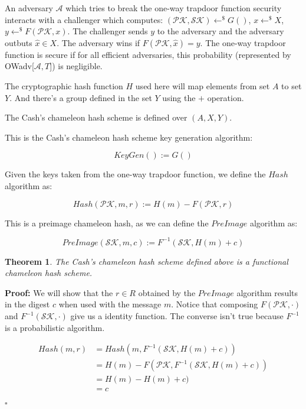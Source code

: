 \documentclass[a4paper]{article}
\newtheorem{theorem}{Theorem}
\newcommand*{\qed}{\hfill\ensuremath{\square}}
\begin{document}
 An adversary $\mathcal{A}$ which tries to break the one-way trapdoor
 function security interacts with a challenger which computes:
 $(\mathcal{PK}, \mathcal{SK}) \leftarrow^{\$}G()$, $x
 \leftarrow^{\$}X$, $y \leftarrow^{\$}F(\mathcal{PK}, x)$. The
 challenger sends $y$ to the adversary and the adversary outbuts $\hat
 x \in X$. The adversary wins if $F(\mathcal{PK}, \hat x) = y$. The
 one-way trapdoor function is secure if for all efficient adversaries,
 this probability (represented by OWadv[$\mathcal{A}, T$]) is
 negligible.
 
 The cryptographic hash function $H$ used here will map elements from
 set $A$ to set $Y$. And there's a group defined in the set $Y$ using
 the $+$ operation.
 
 The Cash's chameleon hash scheme is defined over $(A, X, Y)$.
 
This is the Cash's chameleon hash scheme key generation algorithm:

$$
KeyGen() := G()
$$
 
Given the keys taken from the one-way trapdoor function, we define the
$Hash$ algorithm as:

$$
Hash(\mathcal{PK}, m, r) := H(m) - F(\mathcal{PK}, r)
$$

This is a preimage chameleon hash, as we can define the $PreImage$
algorithm as:

$$
PreImage(\mathcal{SK}, m, c) := F^{-1}(\mathcal{SK}, H(m) + c)
$$

\begin{theorem}
The Cash's chameleon hash scheme defined above is a functional
chameleon hash scheme.
\end{theorem}

\textbf{Proof:} We will show that the $r \in R$ obtained by the
$PreImage$ algorithm results in the digest $c$ when used with the
message $m$. Notice that composing $F(\mathcal{PK}, \cdot)$ and
$F^{-1}(\mathcal{SK}, \cdot)$ give us a identity function. The
converse isn't true because $F^{-1}$ is a probabilistic algorithm.

\begin{equation}
 \begin{split}
 Hash(m, r) &= Hash(m, F^{-1}(\mathcal{SK}, H(m) + c))\\
 &= H(m) - F(\mathcal{PK}, F^{-1}(\mathcal{SK}, H(m) + c))\\
&= H(m) - H(m) + c)\\
&= c\\
 \end{split}
 \end{equation} \qed
\end{document}
